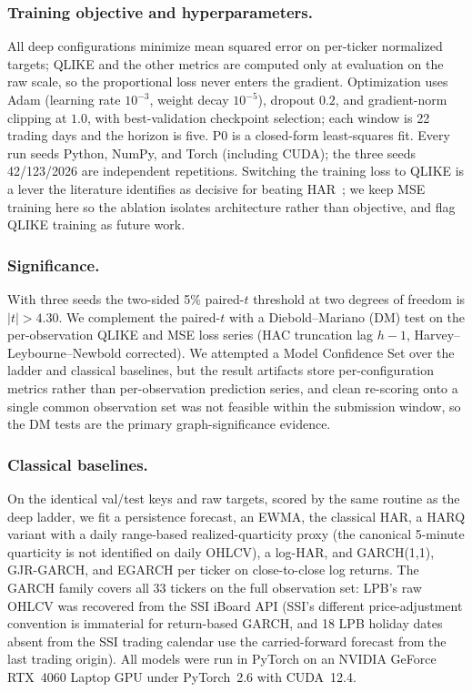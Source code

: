 \documentclass[runningheads]{llncs}
\newcommand{\tcrit}{4.30}
\newcommand{\ntick}{33}
\begin{document}
\subsubsection{Training objective and hyperparameters.}
All deep configurations minimize mean squared error on per-ticker normalized targets; QLIKE and the other
metrics are computed only at evaluation on the raw scale, so the proportional loss never enters the
gradient. Optimization uses Adam (learning rate $10^{-3}$, weight decay $10^{-5}$), dropout $0.2$, and
gradient-norm clipping at $1.0$, with best-validation checkpoint selection; each window is 22 trading days
and the horizon is five. P0 is a closed-form least-squares fit. Every run seeds Python, NumPy, and Torch
(including CUDA); the three seeds 42/123/2026 are independent repetitions. Switching the training loss to
QLIKE is a lever the literature identifies as decisive for beating HAR~\cite{zhang2025gnnhar}; we keep MSE
training here so the ablation isolates architecture rather than objective, and flag QLIKE training as
future work.

\subsubsection{Significance.}
With three seeds the two-sided 5\% paired-$t$ threshold at two degrees of freedom is $|t|>\tcrit$. We
complement the paired-$t$ with a Diebold--Mariano (DM) test on the per-observation QLIKE and MSE loss
series (HAC truncation lag $h-1$, Harvey--Leybourne--Newbold corrected). We attempted a Model Confidence
Set over the ladder and classical baselines, but the result artifacts store per-configuration metrics
rather than per-observation prediction series, and clean re-scoring onto a single common observation set
was not feasible within the submission window, so the DM tests are the
primary graph-significance evidence.

\subsubsection{Classical baselines.}
On the identical val/test keys and raw targets, scored by the same routine as the deep ladder, we fit a
persistence forecast, an EWMA, the classical HAR, a HARQ variant with a daily range-based
realized-quarticity proxy (the canonical 5-minute quarticity is not identified on daily OHLCV), a log-HAR,
and GARCH(1,1), GJR-GARCH, and EGARCH per ticker on close-to-close log returns. The GARCH family covers all
\ntick{} tickers on the full observation set: LPB's raw OHLCV was recovered from the SSI iBoard API (SSI's
different price-adjustment convention is immaterial for return-based GARCH, and 18 LPB holiday dates absent
from the SSI trading calendar use the carried-forward forecast from the last trading origin).
All models were run in PyTorch on an NVIDIA GeForce RTX~4060 Laptop GPU under PyTorch~2.6 with CUDA~12.4.
\end{document}
